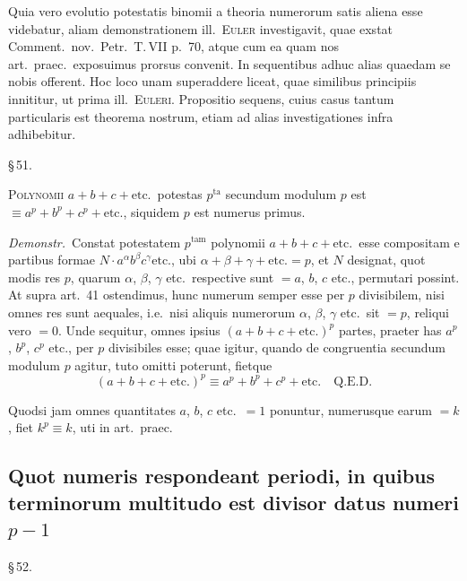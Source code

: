 \documentclass[12pt,a4paper]{article}
\theoremstyle{plain}
\theoremstyle{definition}
\theoremstyle{remark}
\begin{document}
Quia vero evolutio potestatis binomii a theoria numerorum satis aliena esse videbatur, aliam demonstrationem ill.\ \textsc{Euler} investigavit, quae exstat Comment.\ nov.\ Petr.\ T.\,VII p.~70, atque cum ea quam nos art.\ praec.\ exposuimus prorsus convenit. In sequentibus adhuc alias quaedam se nobis offerent. Hoc loco unam superaddere liceat, quae similibus principiis innititur, ut prima ill.\ \textsc{Euleri}. Propositio sequens, cuius casus tantum particularis est theorema nostrum, etiam ad alias investigationes infra adhibebitur.

\begin{center}\S\,51.\end{center}

\textsc{Polynomii} $a + b + c + \text{etc.}$\ potestas $p^\text{ta}$ secundum modulum $p$ est $\equiv a^p + b^p + c^p + \text{etc.}$, siquidem $p$ est numerus primus.

\textit{Demonstr.}\ Constat potestatem $p^\text{tam}$ polynomii $a + b + c + \text{etc.}$\ esse compositam e partibus formae $N \cdot a^\alpha b^\beta c^\gamma \text{etc.}$, ubi $\alpha + \beta + \gamma + \text{etc.} = p$, et $N$ designat, quot modis res $p$, quarum $\alpha$, $\beta$, $\gamma$ etc.\ respective sunt $= a$, $b$, $c$ etc., permutari possint. At supra art.~41 ostendimus, hunc numerum semper esse per $p$ divisibilem, nisi omnes res sunt aequales, i.e.\ nisi aliquis numerorum $\alpha$, $\beta$, $\gamma$ etc.\ sit $= p$, reliqui vero $= 0$. Unde sequitur, omnes ipsius $(a + b + c + \text{etc.})^p$ partes, praeter has $a^p$, $b^p$, $c^p$ etc., per $p$ divisibiles esse; quae igitur, quando de congruentia secundum modulum $p$ agitur, tuto omitti poterunt, fietque
\[
(a + b + c + \text{etc.})^p \equiv a^p + b^p + c^p + \text{etc.} \quad \text{Q.E.D.}
\]

Quodsi jam omnes quantitates $a$, $b$, $c$ etc.\ $= 1$ ponuntur, numerusque earum $= k$, fiet $k^p \equiv k$, uti in art.\ praec.

\subsection*{Quot numeris respondeant periodi, in quibus terminorum multitudo est divisor datus numeri $p-1$}

\begin{center}\S\,52.\end{center}
\end{document}
